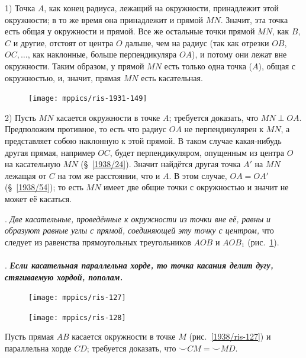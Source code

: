 \documentclass[twoside]{book}
\begin{document}
1) Точка $A$, как конец радиуса, лежащий на окружности, принадлежит этой окружности;
в то же время она принадлежит и прямой $MN$.
Значит, эта точка есть общая у окружности и прямой.
Все же остальные точки прямой $MN$, как $B$, $C$ и другие, отстоят от центра $O$ дальше, чем на радиус (так как отрезки $OB$, $OC,\dots$, как наклонные, больше перпендикуляра $OA$), и потому они лежат вне окружности.
Таким образом, у прямой $MN$ есть только одна точка ($A$), общая с окружностью, и, значит, прямая $MN$ есть касательная.

\begin{figure}
\centering
\texttt{[image: mppics/ris-1931-149]}
\caption{}\label{1931/ris-149}
\end{figure}

2) Пусть $MN$ касается окружности в точке $A$; требуется доказать, что $MN\perp OA$.
Предположим противное, то есть что радиус $OA$ не перпендикулярен к $MN$, а представляет собою наклонную к этой прямой.
В таком случае какая-нибудь другая прямая, например $OC$, будет перпендикуляром, опущенным из центра $O$ на касательную $MN$ (§~\ref{1938/24}).
Значит найдётся другая точка $A'$ на $MN$ лежащая от $C$ на том же расстоянии, что и $A$.
В этом случае, $OA=OA'$ (§~\ref{1938/54});
то есть $MN$ имеет две общие точки с окружностью и значит не может её касаться.

\smallskip
\mbox{.}
\emph{Две касательные, проведённые к окружности из точки вне её, равны и образуют равные углы с прямой, соединяющей эту точку с центром,} что следует из равенства прямоугольных треугольников $AOB$ и $AOB_1$ (рис.~\ref{1931/ris-149}).

\paragraph{}\label{1938/114}
\mbox{.}
\textbf{\emph{Если касательная параллельна хорде, то точка касания делит дугу, стягиваемую хордой, пополам.}}

\begin{figure}
\centering
\texttt{[image: mppics/ris-127]}
\caption{}\label{1938/ris-127}
\bigskip
\texttt{[image: mppics/ris-128]}
\caption{}\label{1938/ris-128}
\end{figure}

Пусть прямая $AB$ касается окружности в точке $M$ (рис.~\ref{1938/ris-127}) и параллельна хорде $CD$;
требуется доказать, что ${\smallsmile}CM={\smallsmile}MD$.
\end{document}
